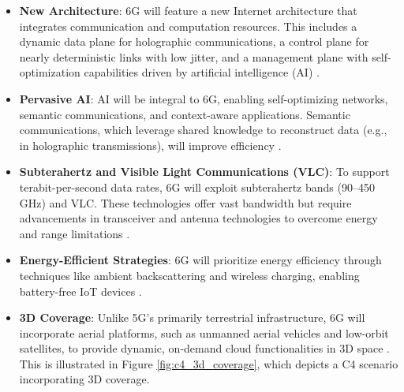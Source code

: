 \documentclass[acmtog]{acmart}
\begin{document}
\begin{itemize}
  \item \textbf{New Architecture}: 6G will feature a new Internet architecture that integrates communication and computation resources. This includes a dynamic data plane for holographic communications, a control plane for nearly deterministic links with low jitter, and a management plane with self-optimization capabilities driven by artificial intelligence (AI) \citep{ref4}.
  \item \textbf{Pervasive AI}: AI will be integral to 6G, enabling self-optimizing networks, semantic communications, and context-aware applications. Semantic communications, which leverage shared knowledge to reconstruct data (e.g., in holographic transmissions), will improve efficiency \citep{ref4_4}.
  \item \textbf{Subterahertz and Visible Light Communications (VLC)}: To support terabit-per-second data rates, 6G will exploit subterahertz bands (90--450 GHz) and VLC. These technologies offer vast bandwidth but require advancements in transceiver and antenna technologies to overcome energy and range limitations \citep{ref4_1}.
  \item \textbf{Energy-Efficient Strategies}: 6G will prioritize energy efficiency through techniques like ambient backscattering and wireless charging, enabling battery-free IoT devices \citep{ref4_5}.
  \item \textbf{3D Coverage}: Unlike 5G's primarily terrestrial infrastructure, 6G will incorporate aerial platforms, such as unmanned aerial vehicles and low-orbit satellites, to provide dynamic, on-demand cloud functionalities in 3D space \citep{ref4}. This is illustrated in Figure \ref{fig:c4_3d_coverage}, which depicts a C4 scenario incorporating 3D coverage.
\end{itemize}
\end{document}
